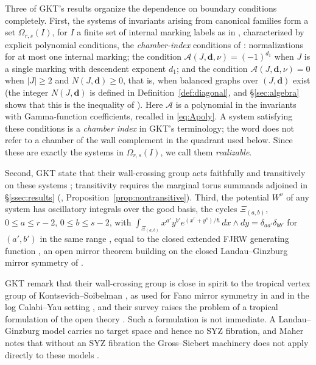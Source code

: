 \documentclass[11pt]{amsart}
\theoremstyle{definition}
\theoremstyle{remark}
\newcommand{\Ascr}{\mathcal{A}}
\newcommand{\Om}{\Omega_{r,s}}
\begin{document}
Three of GKT's results organize the dependence on boundary conditions
completely. First, the systems
of invariants arising from canonical families form a set $\Om(I)$, for $I$ a
finite set of internal marking labels as in \cite{GKT}, characterized by
explicit polynomial conditions, the \emph{chamber-index} conditions of
\cite[Def.~3.47, Cor.~5.14]{GKT}: normalizations for at most one internal
marking; the condition $\Ascr(J,\mathbf d,\nu)=(-1)^{d_1}$ when $J$ is a single
marking with descendent exponent $d_1$; and the condition
$\Ascr(J,\mathbf d,\nu)=0$ when $|J|\ge2$ and $N(J,\mathbf d)\ge0$, that is,
when balanced graphs over $(J,\mathbf d)$ exist (the integer
$N(J,\mathbf d)$ is defined in Definition~\ref{def:diagonal}, and
\S\ref{sec:algebra}
shows that this is the inequality of \cite[Def.~3.47]{GKT}).  Here $\Ascr$ is a
polynomial in the invariants with Gamma-function coefficients, recalled in
\eqref{eq:Apoly}.  A system satisfying these
conditions is a \emph{chamber index} in GKT's terminology; the word does not
refer to a chamber of the wall complement in the quadrant used below.  Since
these are exactly the systems in $\Om(I)$, we call them \emph{realizable}.

Second,
GKT state that their wall-crossing group acts faithfully and transitively on
these systems \cite[Thm.~4.27 and Cor.~5.14]{GKT}; transitivity requires the
marginal torus summands adjoined in \S\ref{ssec:results}
(\cite[Prop.~1.4 and Rem.~3.1]{note}, Proposition~\ref{prop:nontransitive}).
Third, the
potential $W^{\nu}$ of any system has oscillatory integrals over the good
basis, the cycles $\Xi_{(a,b)}$, $0\le a\le r-2$, $0\le b\le s-2$, with
$\int_{\Xi_{(a,b)}}x^{a'}y^{b'}e^{(x^r+y^s)/\hbar}\,dx\wedge dy
=\delta_{aa'}\delta_{bb'}$ for $(a',b')$ in the same range \cite[(4.3)]{GKT}, equal to the closed extended FJRW
generating function
\cite[Thm.~0.3]{GKT}, an open mirror theorem building on the closed
Landau--Ginzburg mirror symmetry of \cite{LLSS,HLSW}.

GKT remark \cite[Rem.~0.8]{GKT} that their wall-crossing group is
close in spirit to the tropical vertex group of Kontsevich--Soibelman \cite{KS06},
as used for Fano mirror symmetry in \cite{GPS10,Gross10} and in the log
Calabi--Yau setting \cite{GHK15}, and their survey raises
the problem of a tropical formulation of the open theory \cite{GKTsurvey}. Such a
formulation is not immediate. A Landau--Ginzburg model carries no target space and
hence no SYZ fibration, and Maher notes that without an SYZ fibration the
Gross--Siebert machinery does not apply directly to these models
\cite[Rem.~5.1.1]{Maher}.
\end{document}
